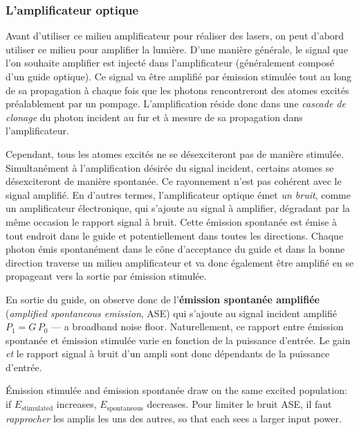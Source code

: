 \subsubsection{L'amplificateur optique}
Avant d'utiliser ce milieu amplificateur pour réaliser des lasers, on peut
d'abord utiliser ce milieu pour amplifier la lumière. D'une manière générale, le
signal que l'on souhaite amplifier est injecté dans l'amplificateur
(généralement composé d'un guide optique). Ce signal va être amplifié par
émission stimulée tout au long de sa propagation à chaque fois que les photons
rencontreront des atomes excités préalablement par un pompage. L'amplification
réside donc dans une \emph{cascade de clonage} du photon incident au fur et à
mesure de sa propagation dans l'amplificateur.

Cependant, tous les atomes excités ne se désexciteront pas de manière stimulée.
Simultanément à l'amplification désirée du signal incident, certains atomes se
désexciteront de manière spontanée. Ce rayonnement n'est pas cohérent avec le
signal amplifié. En d'autres termes, l'amplificateur optique émet \emph{un
bruit}, comme un amplificateur électronique, qui s'ajoute au signal à amplifier,
dégradant par la même occasion le rapport signal à bruit. Cette émission
spontanée est émise à tout endroit dans le guide et potentiellement dans toutes
les directions. Chaque photon émis spontanément dans le cône d'acceptance du
guide et dans la bonne direction traverse un milieu amplificateur et va donc
également être amplifié en se propageant vers la sortie par émission stimulée.

\begin{definition}[ASE]
  En sortie du guide, on observe donc de l'\textbf{émission spontanée amplifiée}
  (\textit{amplified spontaneous emission}, ASE) qui s'ajoute au signal incident
  amplifié $P_1=G\,P_0$ --- a broadband noise floor. Naturellement, ce rapport
  entre émission spontanée et émission stimulée varie en fonction de la
  puissance d'entrée. Le gain \emph{et} le rapport signal à bruit d'un ampli
  sont donc dépendants de la puissance d'entrée.
\end{definition}

\begin{remark}
  Émission stimulée and émission spontanée draw on the same excited population:
  if $E_{\text{stimulated}}$ increases, $E_{\text{spontaneous}}$ decreases. Pour
  limiter le bruit ASE, il faut \emph{rapprocher} les amplis les uns des autres,
  so that each sees a larger input power.
\end{remark}

